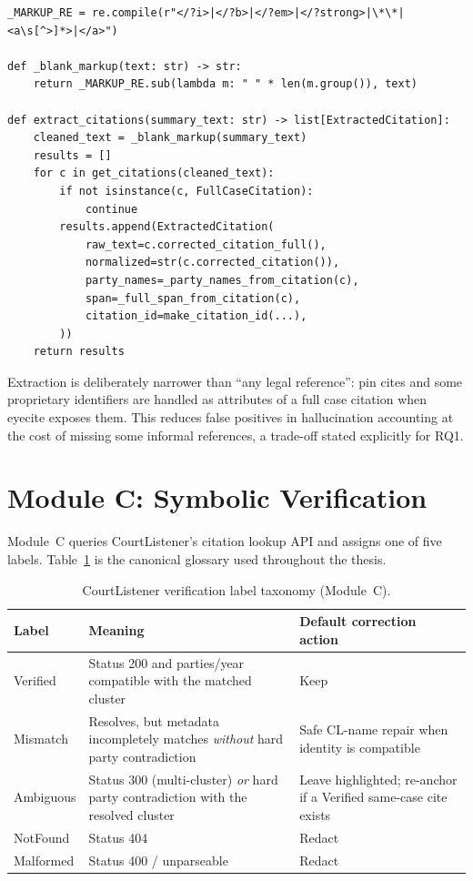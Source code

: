 \begin{lstlisting}[caption={Length-preserving markup blanking before eyecite parsing (\href{\repourl/blob/main/src/module_b_extraction/extract_citations.py}{\texttt{src/module\_b\_extraction/extract\_citations.py}}).}, label={lst:module-b-blank}]
_MARKUP_RE = re.compile(r"</?i>|</?b>|</?em>|</?strong>|\*\*|<a\s[^>]*>|</a>")

def _blank_markup(text: str) -> str:
    return _MARKUP_RE.sub(lambda m: " " * len(m.group()), text)

def extract_citations(summary_text: str) -> list[ExtractedCitation]:
    cleaned_text = _blank_markup(summary_text)
    results = []
    for c in get_citations(cleaned_text):
        if not isinstance(c, FullCaseCitation):
            continue
        results.append(ExtractedCitation(
            raw_text=c.corrected_citation_full(),
            normalized=str(c.corrected_citation()),
            party_names=_party_names_from_citation(c),
            span=_full_span_from_citation(c),
            citation_id=make_citation_id(...),
        ))
    return results
\end{lstlisting}

Extraction is deliberately narrower than ``any legal reference'': pin cites and some proprietary identifiers are handled as attributes of a full case citation when eyecite exposes them. This reduces false positives in hallucination accounting at the cost of missing some informal references, a trade-off stated explicitly for RQ1.

\section{Module C: Symbolic Verification}
\label{sec:module-c}

Module~C queries CourtListener's citation lookup API \cite{courtlistener_api} and assigns one of five labels. Table~\ref{tab:label-taxonomy} is the canonical glossary used throughout the thesis.

\begin{table}[!t]
\centering
\caption{CourtListener verification label taxonomy (Module~C).}
\label{tab:label-taxonomy}
\begin{tabular}{@{}p{2.3cm}p{5.2cm}p{5.0cm}@{}}
\toprule
\textbf{Label} & \textbf{Meaning} & \textbf{Default correction action} \\
\midrule
Verified & Status 200 and parties/year compatible with the matched cluster & Keep \\
Mismatch & Resolves, but metadata incompletely matches \emph{without} hard party contradiction & Safe CL-name repair when identity is compatible \\
Ambiguous & Status 300 (multi-cluster) \emph{or} hard party contradiction with the resolved cluster & Leave highlighted; re-anchor if a Verified same-case cite exists \\
NotFound & Status 404 & Redact \\
Malformed & Status 400 / unparseable & Redact \\
\bottomrule
\end{tabular}
\end{table}

